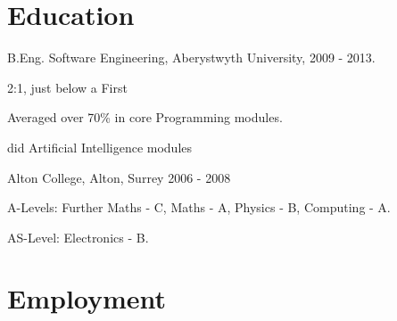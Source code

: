 \documentclass[a4paper]{article}
\renewenvironment{itemize}{
  \begin{list}{}{
    \setlength{\leftmargin}{1.5em}
  }
}{
  \end{list}
}
\newenvironment{packed}{
\begin{itemize}
  \setlength{\itemsep}{0pt}
  \setlength{\parskip}{0pt}
  \setlength{\parsep}{0pt}
}{\end{itemize}}
\begin{document}


\pagebreak

\section*{Education}

\begin{itemize}
  \item B.Eng. Software Engineering, Aberystwyth University, 2009 - 2013.
	\begin{packed}
	\item 2:1, just below a First
	\item Averaged over 70\% in core Programming modules.
    \item did Artificial Intelligence modules
	\end{packed}

  \item Alton College, Alton, Surrey 2006 - 2008
	\begin{packed}
	\item A-Levels: Further Maths - C, Maths - A, Physics - B, Computing - A.
	\item AS-Level: Electronics - B.
	\end{packed}

\end{itemize}


\section*{Employment}
\end{document}
